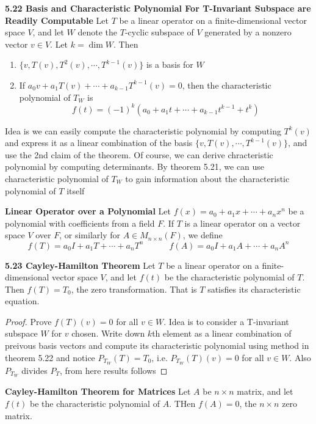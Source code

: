 \documentclass[11pt]{article}
\begin{document}
\begin{theorem*}
    \textbf{5.22 Basis and Characteristic Polynomial For T-Invariant Subspace are Readily Computable}
    Let $T$ be a linear operator on a finite-dimensional vector space $V$, and let $W$ denote the $T$-cyclic subspace of $V$ generated by a nonzero vector $v\in V$. Let $k = \dim{W}$. Then 
    \begin{enumerate}
        \item $\{v, T(v), T^2(v), \cdots, T^{k-1}(v)\}$ is a basis for $W$ 
        \item If $a_0v + a_1T(v) + \cdots + a_{k-1}T^{k-1}(v) = 0$, then the characteristic polynomial of $T_W$ is 
        \[
            f(t) = (-1)^k(a_0 + a_1t + \cdots + a_{k-1}t^{k-1} + t^k)
        \]
    \end{enumerate}
    Idea is we can easily compute the characteristic polynomial by computing $T^k(v)$ and express it as a linear combination of the basis $\{v, T(v), \cdots, T^{k-1}(v)\}$, and use the 2nd claim of the theorem. Of course, we can derive chracteristic polynomial by computing determinants. By theorem 5.21, we can use characteristic polynomial of $T_W$ to gain information about the characteristic polynomial of $T$ itself
\end{theorem*}

\begin{defn*}
    \textbf{Linear Operator over a Polynomial} Let $f(x) = a_0 + a_1 x + \cdots + a_n x^n$ be a polynomial with coefficients from a field $F$. If $T$ is a linear operator on a vector space $V$ over $F$, or similarly for $A\in M_{n\times n}(F)$, we define 
    \[
        f(T) = a_0I + a_1 T + \cdots + a_n T^n    
        \quad \quad \quad 
        f(A) = a_0I + a_1 A + \cdots + a_n A^n
    \]
\end{defn*}

\begin{theorem*}
    \textbf{5.23 Cayley-Hamilton Theorem} Let $T$ be a linear operator on a finite-dimensional vector space $V$, and let $f(t)$ be the characteristic polynomial of $T$. Then $f(T) = T_0$, the zero transformation. That is $T$ satisfies its characteristic equation.  
    \begin{proof}
        Prove $f(T)(v)=0$ for all $v\in W$. Idea is to consider a T-invariant subspace $W$ for $v$ chosen. Write down $k$th element as a linear combination of preivous basis vectors and compute its characteristic polynomial using method in theorem 5.22 and notice $P_{T_W}(T) = T_0$, i.e. $P_{T_W}(T)(v) = 0$ for all $v\in W$. Also $P_{T_W}$ divides $P_{T}$, from here results follows
    \end{proof}
\end{theorem*}

\begin{corollary*}
    \textbf{Cayley-Hamilton Theorem for Matrices} Let $A$ be $n\times n$ matrix, and let $f(t)$ be the characteristic polynomial of $A$. THen $f(A) = 0$, the $n\times n$ zero matrix.
\end{corollary*}
\end{document}
